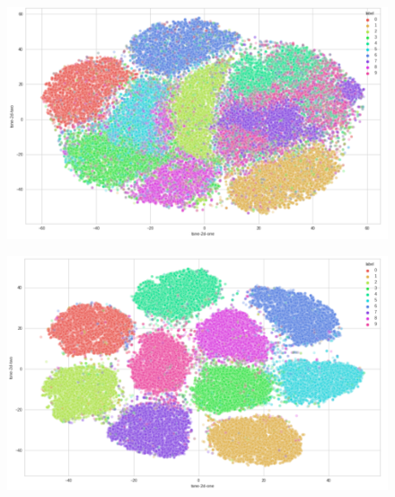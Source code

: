 \documentclass[runningheads]{llncs}
\begin{document}
\begin{figure}
\centering
\begin{minipage}{.5\textwidth}
  \centering
  \includegraphics[width=.9\linewidth]{tsne_unsup.png}
  \label{tsne_un}
\end{minipage}%
\begin{minipage}{.5\textwidth}
  \centering
  \includegraphics[width=.9\linewidth]{tsne_semi.png}
  \label{tsne_semi}
\end{minipage}
\end{figure}
\end{document}
